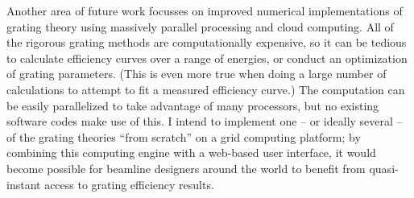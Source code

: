 \documentclass[singlespace,proposal]{uofsthesis-cs}
\begin{document}
Another area of future work focusses on improved numerical implementations of grating theory using massively parallel processing and cloud computing.  All of the rigorous grating methods are computationally expensive, so it can be tedious to calculate efficiency curves over a range of energies, or conduct an optimization of grating parameters. (This is even more true when doing a large number of calculations to attempt to fit a measured efficiency curve.)  The computation can be easily parallelized to take advantage of many processors, but no existing software codes make use of this.  I intend to implement one -- or ideally several -- of the grating theories ``from scratch'' on a grid computing platform; by combining this computing engine with a web-based user interface, it would become possible for beamline designers around the world to benefit from quasi-instant access to grating efficiency results.


%








%

\uofsappendix
\end{document}
